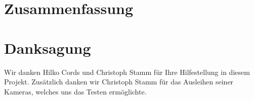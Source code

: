 \section{Zusammenfassung}

\lipsum[28]


\section{Danksagung}

Wir danken Hilko Cords und Christoph Stamm für Ihre Hilfestellung in diesem Projekt. Zusätzlich danken wir Christoph Stamm für das Ausleihen seiner Kameras, welches uns das Testen ermöglichte.
